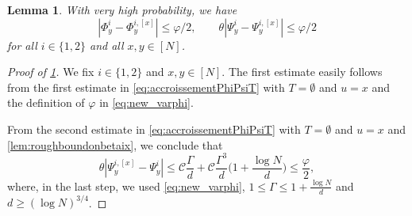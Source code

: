 \documentclass[10pt,a4paper]{amsart}
\newcommand{\abs}[1]{\left| #1 \right|}
\newtheorem{lemma}{Lemma}[section]
\numberwithin{equation}{section}
\newcommand*\bset[1]{[#1]}
\begin{document}
	\begin{lemma}\label{lem:boundthetabsetxvarphi}
		With very high probability, we have
		\begin{equation}\label{eq:accroissementvarphia}
			\abs{\Phi_{y}^{i} - \Phi_{y}^{i,\bset{x}}} \le \varphi/2, \qquad  \theta\abs{\Psi_{y}^{i} - \Psi_{y}^{i,\bset{x}}} \le \varphi/2
		\end{equation}
		for all $i \in \{1,2\}$ and all $x,y \in [N]$.
	\end{lemma}
	
	
	\begin{proof}[Proof of \cref{lem:boundthetabsetxvarphi}]
		We fix $i \in \{1,2\}$ and $x,y \in [N]$. 
	 The first estimate easily follows from the first estimate in 
		\cref{eq:accroissementPhiPsiT} with $T= \emptyset$ and $u=x$ and the definition of $\varphi$ in \cref{eq:new_varphi}. 
		
		From the second estimate in \cref{eq:accroissementPhiPsiT} with $T= \emptyset$ and $u=x$ and \cref{lem:roughboundonbetaix}, we conclude that 
		\[ 
		\theta \abs{\Psi_{y}^{i,\bset{x}} - \Psi_{y}^{i}} \le \mathcal{C}  \frac{\Gamma}{d} + \mathcal C  \frac{\Gamma^3}{d} \bigg( 1 + \frac{ \log N}{d} \bigg)  \leq \frac{\varphi}{2}, 		\] 
		where, in the last step, we used \cref{eq:new_varphi}, $1 \leq \Gamma \leq 1 + \frac{\log N}{d}$ and $d \geq (\log N)^{3/4}$.  
	\end{proof}
\end{document}
